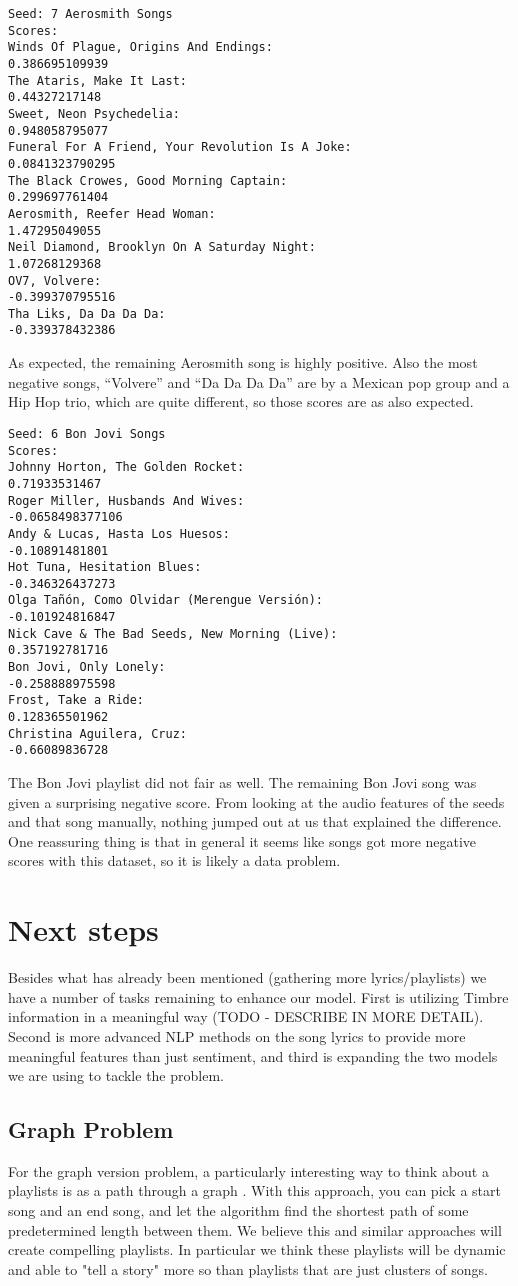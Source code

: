 \documentclass[10pt,journal,compsoc]{IEEEtran}
\begin{document}
\begin{lstlisting}
Seed: 7 Aerosmith Songs
Scores:
Winds Of Plague, Origins And Endings:
0.386695109939
The Ataris, Make It Last:
0.44327217148
Sweet, Neon Psychedelia:
0.948058795077
Funeral For A Friend, Your Revolution Is A Joke:
0.0841323790295
The Black Crowes, Good Morning Captain:
0.299697761404
Aerosmith, Reefer Head Woman:
1.47295049055
Neil Diamond, Brooklyn On A Saturday Night:
1.07268129368
OV7, Volvere:
-0.399370795516
Tha Liks, Da Da Da Da:
-0.339378432386
\end{lstlisting}
As expected, the remaining Aerosmith song is highly positive. Also the most negative songs, ``Volvere'' and ``Da Da Da Da'' are by a Mexican pop group and a Hip Hop trio, which are quite different, so those scores are as also expected.

\begin{lstlisting}
Seed: 6 Bon Jovi Songs
Scores:
Johnny Horton, The Golden Rocket:
0.71933531467
Roger Miller, Husbands And Wives:
-0.0658498377106
Andy & Lucas, Hasta Los Huesos:
-0.10891481801
Hot Tuna, Hesitation Blues:
-0.346326437273
Olga Tañón, Como Olvidar (Merengue Versión):
-0.101924816847
Nick Cave & The Bad Seeds, New Morning (Live):
0.357192781716
Bon Jovi, Only Lonely:
-0.258888975598
Frost, Take a Ride:
0.128365501962
Christina Aguilera, Cruz:
-0.66089836728
\end{lstlisting}
The Bon Jovi playlist did not fair as well. The remaining Bon Jovi song was given a surprising negative score. From looking at the audio features of the seeds and that song manually, nothing jumped out at us that explained the difference. One reassuring thing is that in general it seems like songs got more negative scores with this dataset, so it is likely a data problem.

\section{Next steps}
Besides what has already been mentioned (gathering more lyrics/playlists) we have a number of tasks remaining to enhance our model. First is utilizing Timbre information in a meaningful way (TODO - DESCRIBE IN MORE DETAIL). Second is more advanced NLP methods on the song lyrics to provide more meaningful features than just sentiment, and third is expanding the two models we are using to tackle the problem.

\subsection{Graph Problem}
For the graph version problem, a particularly interesting way to think about a playlists is as a path through a graph \cite{Alghoniemy01anetwork}. With this approach, you can pick a start song and an end song, and let the algorithm find the shortest path of some predetermined length between them. We believe this and similar approaches will create compelling playlists. In particular we think these playlists will be dynamic and able to "tell a story" more so than playlists that are just clusters of songs.
\end{document}
